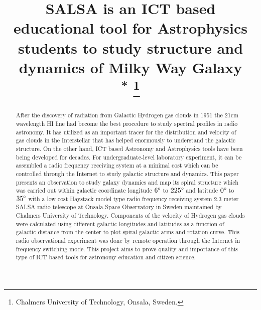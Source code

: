 \documentclass[conference]{IEEEtran}
\begin{document}
\title{SALSA is an ICT based educational tool for Astrophysics students to study structure and dynamics of Milky Way Galaxy\\
{\footnotesize \textsuperscript{*}}
\thanks{Chalmers University of Technology, Onsala, Sweden.}
}

\author{
\and
{}
}

\maketitle

\begin{abstract}
After the discovery of radiation from Galactic Hydrogen gas clouds in 1951 the 21cm wavelength HI line had become the best procedure to study spectral profiles in radio astronomy. It has utilized as an important tracer for the distribution and velocity of gas clouds in the Interstellar that has helped enormously to understand the galactic structure. On the other hand, ICT based Astronomy and Astrophysics tools have been being developed for decades. For undergraduate-level laboratory experiment, it can be assembled a radio frequency receiving system at a minimal cost which can be controlled through the Internet to study galactic structure and dynamics. This paper presents an observation to study galaxy dynamics and map its spiral structure which was carried out within galactic coordinate longitude $6\degree$ to $225\degree$ and latitude $0\degree$ to $35\degree$ with a low cost Haystack model type radio frequency receiving system $2.3$ meter SALSA radio telescope at Onsala Space Observatory in Sweden maintained by Chalmers University of Technology. Components of the velocity of Hydrogen gas clouds were calculated using different galactic longitudes and latitudes as a function of galactic distance from the center to plot spiral galactic arms and rotation curve. This radio observational experiment was done by remote operation through the Internet in frequency switching mode. This project aims to prove quality and importance of this type of ICT based tools for astronomy education and citizen science.
\end{abstract}
\end{document}

